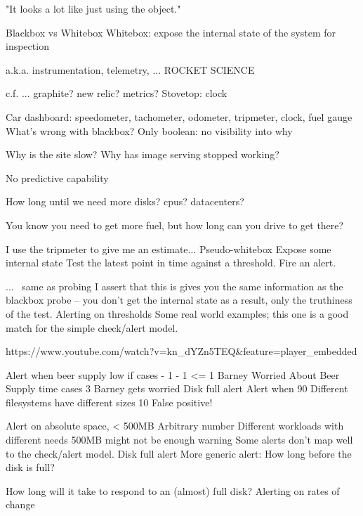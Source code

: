 \documentclass[online,helvetica]{chaksem}
\begin{document}
"It looks a lot like just using the object."   

Blackbox vs Whitebox
Whitebox: expose the internal state of the system for inspection

a.k.a. instrumentation, telemetry,
... ROCKET SCIENCE

c.f. ... graphite? new relic? metrics?
Stovetop: clock                                                                                                                             
                                                                                                                                                               
Car dashboard: speedometer, tachometer, odometer, tripmeter, clock, fuel gauge
What's wrong with blackbox?
Only boolean: no visibility into why

Why is the site slow?
Why has image serving stopped working?

No predictive capability

How long until we need more disks? cpus? datacenters?

You know you need to get more fuel, but how long can you drive to get there?

I use the tripmeter to give me an estimate...
Pseudo-whitebox
Expose some internal state
Test the latest point in time against a threshold.
Fire an alert.



... ~same as probing
I assert that this is gives you the same information as the blackbox probe -- you don't get the internal state as a result, only the truthiness of the test.
Alerting on thresholds
Some real world examples; this one is a good match for the simple check/alert model.

https://www.youtube.com/watch?v=kn_dYZn5TEQ&feature=player_embedded

Alert when beer supply low
if cases - 1 - 1 <= 1
   Barney Worried About Beer Supply
time
cases
3
Barney gets worried
Disk full alert
Alert when 90%
Different filesystems have different sizes
10%
False positive! 

Alert on absolute space, < 500MB
Arbitrary number
Different workloads with different needs 500MB might not be enough warning
Some alerts don't map well to the check/alert model.
Disk full alert
More generic alert:
How long before the disk is full?

How long will it take to respond to an (almost) full disk?
Alerting on rates of change 
\end{document}
